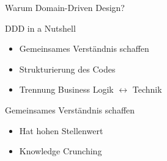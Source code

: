\begin{frame}[fragile]{}

\begin{center}
{
\LARGE
Warum Domain-Driven Design?
}
\end{center}

\end{frame}

\begin{frame}[fragile]{DDD in a Nutshell}

\begin{itemize}
\item Gemeinsames Verständnis schaffen
\item Strukturierung des Codes
\item Trennung Business Logik $\leftrightarrow$ Technik
\end{itemize}

\end{frame}

\begin{frame}[fragile]{Gemeinsames Verständnis schaffen}

\begin{itemize}
\item Hat hohen Stellenwert
\item \glqq Knowledge Crunching\grqq
\end{itemize}

\end{frame}

